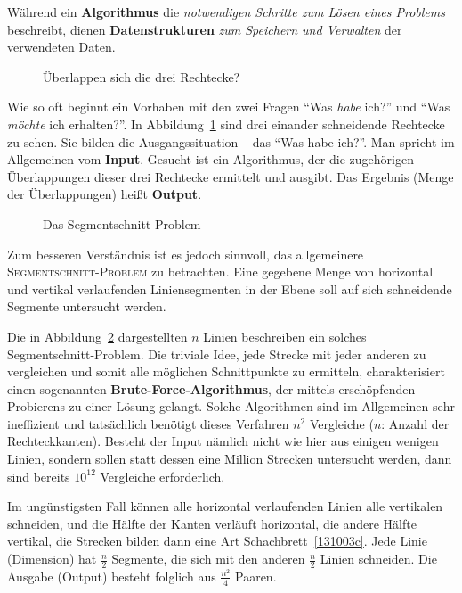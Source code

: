 \documentclass{scrreprt}%
\theoremstyle{break}
\begin{document}
Während ein \textbf{Algorithmus} die \emph{notwendigen Schritte zum Lösen
eines Problems} beschreibt, dienen \textbf{Datenstrukturen}
\emph{zum Speichern und Verwalten} der verwendeten Daten.  

\begin{figure}
  \begin{center}\end{center}

  \caption{Überlappen sich die drei Rechtecke?}
  \label{131003a}
\end{figure}

Wie so oft beginnt ein Vorhaben mit den zwei Fragen "`Was \emph{habe}
ich?"' und "`Was \emph{möchte} ich erhalten?"'. In Abbildung~\ref{131003a}
sind drei einander schneidende Rechtecke zu sehen. Sie bilden die
Ausgangssituation -- das "`Was habe ich?"'. Man spricht im Allgemeinen vom
\textbf{Input}. Gesucht ist ein Algorithmus, der die zugehörigen
Überlappungen dieser drei Rechtecke ermittelt und ausgibt. Das Ergebnis (Menge der Überlappungen)
heißt \textbf{Output}.

\begin{figure}
  \begin{center}\end{center}
  \caption{Das Segmentschnitt-Problem}
  \label{131003b}
\end{figure}

Zum besseren Verständnis ist es jedoch sinnvoll, das allgemeinere
\textsc{Segmentschnitt-Problem} zu betrachten. Eine
gegebene Menge von horizontal und vertikal verlaufenden Liniensegmenten
in der Ebene soll auf sich schneidende Segmente untersucht werden.

Die in Abbildung~\ref{131003b} dargestellten $n$ Linien beschreiben ein
solches Segmentschnitt-Problem. Die triviale Idee, jede Strecke mit jeder
anderen zu vergleichen und somit alle möglichen Schnittpunkte zu
ermitteln, charakterisiert einen sogenannten
\textbf{Brute-Force-Algorithmus}, der mittels erschöpfenden Probierens zu
einer Lösung gelangt. Solche Algorithmen sind im Allgemeinen sehr
ineffizient und tatsächlich benötigt dieses Verfahren $n^2$ Vergleiche
($n$: Anzahl der Rechteckkanten). Besteht der Input nämlich nicht wie
hier aus einigen wenigen Linien, sondern sollen statt dessen eine Million
Strecken untersucht werden, dann sind bereits $10^{12}$ Vergleiche
erforderlich.

Im ungünstigsten Fall können alle horizontal verlaufenden Linien
alle vertikalen schneiden, und die Hälfte der Kanten verläuft
horizontal, die andere Hälfte vertikal, die Strecken bilden dann eine
Art Schachbrett~\ref{131003c}. Jede Linie (Dimension) hat $\frac{n}{2}$ Segmente,
die sich mit den anderen $\frac{n}{2}$ Linien schneiden.  Die Ausgabe
(Output) besteht folglich aus $\frac{n^2}{4}$ Paaren. 
\end{document}
